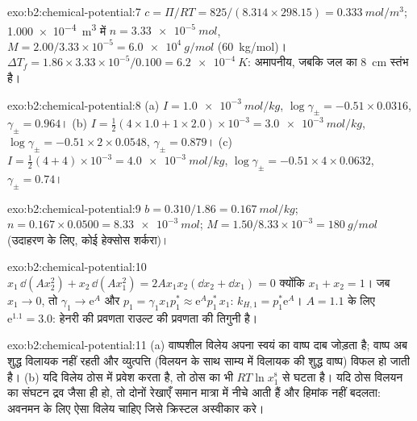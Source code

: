\begin{solution}{exo:b2:chemical-potential:7}
$c = \Pi/RT = 825/(8.314 \times 298.15) = \qty{0.333}{mol/m^3}$;
\qty{1.000e-4}{m^3} में $n = \qty{3.33e-5}{mol}$, $M = 2.00/3.33 \times 10^{-5}
= \qty{6.0e4}{g/mol}$ (\qty{60}{kg/mol})। $\Delta T_f = 1.86 \times 3.33
\times 10^{-5}/0.100 = \qty{6.2e-4}{K}$: अमापनीय, जबकि  जल का \qty{8}{cm} स्तंभ है।
\end{solution}

\begin{solution}{exo:b2:chemical-potential:8}
(a) $I = \qty{1.0e-3}{mol/kg}$, $\log\gamma_\pm = -0.51 \times 0.0316$,
$\gamma_\pm = 0.964$। (b) $I = \frac12(4 \times 1.0 + 1 \times 2.0) \times
10^{-3} = \qty{3.0e-3}{mol/kg}$, $\log\gamma_\pm = -0.51 \times 2 \times 0.0548$,
$\gamma_\pm = 0.879$। (c) $I = \frac12(4 + 4) \times 10^{-3} = \qty{4.0e-3}{mol/kg}$,
$\log\gamma_\pm = -0.51 \times 4 \times 0.0632$, $\gamma_\pm = 0.74$।
\end{solution}

\begin{solution}{exo:b2:chemical-potential:9}
$b = 0.310/1.86 = \qty{0.167}{mol/kg}$; $n = 0.167 \times 0.0500 =
\qty{8.33e-3}{mol}$; $M = 1.50/8.33 \times 10^{-3} = \qty{180}{g/mol}$ (उदाहरण के लिए,
कोई हेक्सोस शर्करा)।
\end{solution}

\begin{solution}{exo:b2:chemical-potential:10}
$x_1\,\dd(Ax_2^2) + x_2\,\dd(Ax_1^2) = 2Ax_1x_2(\dd x_2 + \dd x_1) = 0$ क्योंकि
$x_1 + x_2 = 1$। जब $x_1 \to 0$, तो $\gamma_1 \to \mathrm e^{A}$ और $p_1 =
\gamma_1x_1p_1^* \approx \mathrm e^{A}p_1^*\,x_1$: $k_{H,1} = p_1^*\mathrm e^A$।
$A = 1.1$ के लिए $\mathrm e^{1.1} = 3.0$: हेनरी की प्रवणता राउल्ट की प्रवणता की तिगुनी है।
\end{solution}

\begin{solution}{exo:b2:chemical-potential:11}
(a) वाष्पशील विलेय अपना स्वयं का वाष्प दाब जोड़ता है; वाष्प अब
शुद्ध विलायक नहीं रहती और व्युत्पत्ति (विलयन के साथ साम्य में विलायक की शुद्ध
वाष्प) विफल हो जाती है। (b) यदि विलेय ठोस में प्रवेश करता है, तो
ठोस का  भी $RT\ln x_1^{\text{s}}$ से घटता है। यदि
ठोस विलयन का संघटन द्रव जैसा ही हो, तो दोनों रेखाएँ समान मात्रा में नीचे
आती हैं और हिमांक नहीं बदलता: अवनमन के लिए ऐसा विलेय
चाहिए जिसे क्रिस्टल अस्वीकार करे।
\end{solution}

